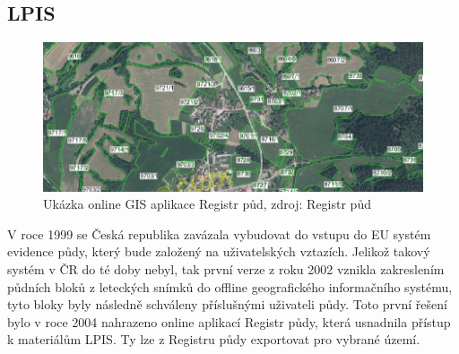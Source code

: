\subsection{LPIS}
\begin{figure}[H]
    \centering
      \includegraphics[scale=0.75]{./pictures/lpis.png}
      \caption[Ukázka GIS online aplikace Registr půd]{Ukázka online GIS aplikace Registr půd, zdroj: Registr půd\cite{lpis}}
      \label{fig:lpis}
\end{figure}
V roce 1999 se Česká republika zavázala vybudovat do vstupu do EU systém evidence půdy, který bude založený na uživatelských vztazích. Jelikož takový systém v ČR do té doby nebyl, tak první verze z roku 2002 vznikla zakreslením půdních bloků z leteckých snímků do offline geografického informačního systému, tyto bloky byly následně schváleny příslušnými uživateli půdy. Toto první řešení bylo v roce 2004 nahrazeno online aplikací Registr půdy\cite{lpis}, která usnadnila přístup k materiálům LPIS. Ty lze z Registru půdy exportovat pro vybrané území.\cite{lpis}

